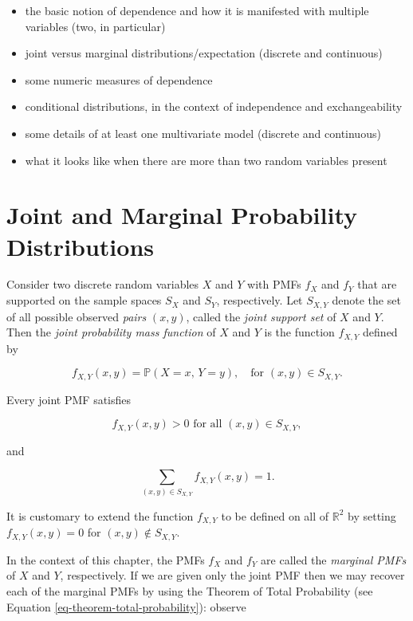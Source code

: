 \documentclass[]{book}
\providecommand{\tightlist}{%
  \setlength{\itemsep}{0pt}\setlength{\parskip}{0pt}}
\numberwithin{equation}{chapter}
\numberwithin{figure}{chapter}
\theoremstyle{plain}
\theoremstyle{definition}
\theoremstyle{remark}
\theoremstyle{definition}
\theoremstyle{definition}
\theoremstyle{remark}
\begin{document}
\begin{itemize}
\tightlist
\item
  the basic notion of dependence and how it is manifested with multiple
  variables (two, in particular)
\item
  joint versus marginal distributions/expectation (discrete and
  continuous)
\item
  some numeric measures of dependence
\item
  conditional distributions, in the context of independence and
  exchangeability
\item
  some details of at least one multivariate model (discrete and
  continuous)
\item
  what it looks like when there are more than two random variables
  present
\end{itemize}

\section{Joint and Marginal Probability
Distributions}\label{sec-joint-probability-distributions}

Consider two discrete random variables \(X\) and \(Y\) with PMFs
\(f_{X}\) and \(f_{Y}\) that are supported on the sample spaces
\(S_{X}\) and \(S_{Y}\), respectively. Let \(S_{X,Y}\) denote the set of
all possible observed \emph{pairs} \((x,y)\), called the \emph{joint
support set} of \(X\) and \(Y\). Then the \emph{joint probability mass
function} of \(X\) and \(Y\) is the function \(f_{X,Y}\) defined by

\begin{equation}
\label{eq-joint-pmf}
f_{X,Y}(x,y)=\mathbb{P}(X=x,\, Y=y),\quad \mbox{for }(x,y)\in S_{X,Y}.
\end{equation}

Every joint PMF satisfies

\begin{equation}
f_{X,Y}(x,y)>0\mbox{ for all }(x,y)\in S_{X,Y},
\end{equation}

and

\begin{equation}
\sum_{(x,y)\in S_{X,Y}}f_{X,Y}(x,y)=1.
\end{equation}

It is customary to extend the function \(f_{X,Y}\) to be defined on all
of \(\mathbb{R}^{2}\) by setting \(f_{X,Y}(x,y)=0\) for
\((x,y)\not\in S_{X,Y}\).

In the context of this chapter, the PMFs \(f_{X}\) and \(f_{Y}\) are
called the \emph{marginal PMFs} of \(X\) and \(Y\), respectively. If we
are given only the joint PMF then we may recover each of the marginal
PMFs by using the Theorem of Total Probability (see Equation
\eqref{eq-theorem-total-probability}): observe
\end{document}

